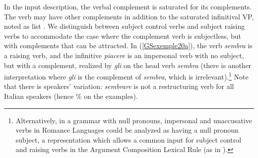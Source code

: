 \documentclass[output=paper
                ,modfonts
                ,nonflat
	        ,collection
	        ,collectionchapter
	        ,collectiontoclongg
 	        ,biblatex
                ,babelshorthands
                ,newtxmath
                ,draftmode
                ,colorlinks, citecolor=brown
]{./langsci/langscibook}
\begin{document}
{\begin{exe}
\begin{xlist}
	\end{xlist}
\end{exe}

In the input description, the verbal complement is saturated for its complements. The verb may have other complements in addition to the saturated infinitival VP, noted as list . We distinguish between subject control verbs and subject raising verbs to accommodate the case where the complement verb is subjectless, but with complements that can be attracted. In (\ref{GSexemple20a}), the verb \emph{sembra} is a raising verb, and the infinitive \emph{piacere} is an impersonal verb with no subject, but with a complement, realized by \emph{gli} on the head verb \emph{sembra} (there is another interpretation where \emph{gli} is the complement of \emph{sembra}, which is irrelevant).\footnote{Alternatively, in a grammar with null pronouns, impersonal and unaccusative verbs in Romance Languages could be analyzed as having a null pronoun subject, a representation which allows a common input for subject control and raising verbs in the Argument Composition Lexical Rule (as in \citealt{Monachesi98a}).} Note that there is speakers' variation: \emph{sembrare} is not a restructuring verb for all Italian speakers (hence \% on the examples).   

}
\end{document}
